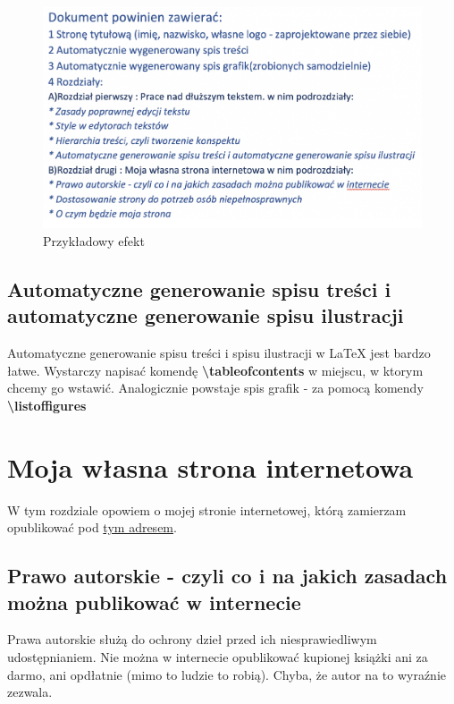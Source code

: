 \documentclass[11pt,polish]{article}
\begin{document}
\begin{center}
  \begin{figure}[h]
      \centering
      \includegraphics[scale=0.3]{efekt}
      \caption{Przykładowy efekt}
  \end{figure}
\end{center}

\newpage

\subsection{Automatyczne generowanie spisu treści i automatyczne generowanie spisu ilustracji}
Automatyczne generowanie spisu treści i spisu ilustracji w \LaTeX { }jest bardzo łatwe. Wystarczy napisać komendę \textbf{\textbackslash{tableofcontents}} w miejscu, w ktorym chcemy go wstawić. Analogicznie powstaje spis grafik - za pomocą komendy \textbf{\textbackslash{listoffigures}}
 \\

\section{Moja własna strona internetowa}
W tym rozdziale opowiem o mojej stronie internetowej, którą zamierzam opublikować pod \href{https://aszokalski.w.staszic.waw.pl}{tym adresem}. 
\subsection{Prawo autorskie - czyli co i na jakich zasadach można publikować w internecie}
Prawa autorskie służą do ochrony dzieł przed ich niesprawiedliwym udostępnianiem. Nie można w internecie opublikować kupionej książki ani za darmo, ani opdłatnie (mimo to ludzie to robią). Chyba, że autor na to wyraźnie zezwala. 
\end{document}
